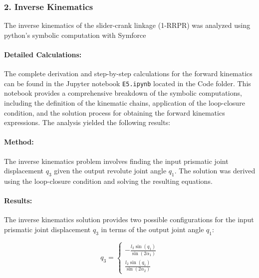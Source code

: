 \begin{solution}
    \subsubsection*{2. Inverse Kinematics}
    
%    
    
The inverse kinematics of the slider-crank linkage (1-RRPR) was analyzed using python's symbolic computation with Symforce \cite{martiros2022symforce} \paragraph{Detailed Calculations:} The complete derivation and step-by-step calculations for the forward kinematics can be found in the Jupyter notebook \texttt{E5.ipynb} located in the Code folder. This notebook provides a comprehensive breakdown of the symbolic computations, including the definition of the kinematic chains, application of the loop-closure condition, and the solution process for obtaining the forward kinematics expressions. The analysis yielded the following results:

\paragraph{Method:} The inverse kinematics problem involves finding the input prismatic joint displacement $q_3$ given the output revolute joint angle $q_1$. The solution was derived using the loop-closure condition and solving the resulting equations.

\paragraph{Results:} The inverse kinematics solution provides two possible configurations for the input prismatic joint displacement $q_3$ in terms of the output joint angle $q_1$:

\begin{equation}
q_3 = \begin{cases}
    -\frac{l_2 \sin(q_1)}{\sin(2\alpha_1)} \\[10pt]
    \frac{l_2 \sin(q_1)}{\sin(2\alpha_2)}
\end{cases}
\end{equation}


\end{solution}
